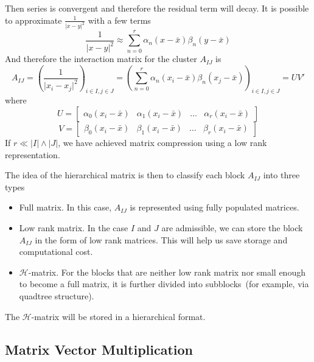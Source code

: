 \documentclass[3p,,preprint,12pt]{elsarticle}
\theoremstyle{definition}
\begin{document}
Then series is convergent and therefore the residual term will decay. It is possible to approximate $\frac{1}{{|x - y{|^2}}}$ with a few terms
\begin{equation}
	\frac{1}{{|x - y{|^2}}} \approx \sum_{n=0}^r \alpha_n(x-\bar x)\beta_n(y-\bar x)
\end{equation}
And therefore the interaction matrix for the cluster $A_{IJ}$ is 
\begin{equation}
	A_{IJ} = \left(\frac{1}{{|x_i - x_j{|^2}}}\right)_{i\in I, j\in J} =\left( \sum_{n=0}^r \alpha_n(x_i-\bar x)\beta_n(x_j-\bar x)\right)_{i\in I, j\in J} = UV'
\end{equation}
where
\begin{equation}
	U = \begin{bmatrix}
		\alpha_0(x_i-\bar x)& \alpha_1(x_i-\bar x)&\ldots & \alpha_r(x_i-\bar x)
	\end{bmatrix}
\end{equation}
\begin{equation}
	V = \begin{bmatrix}
		\beta_0(x_i-\bar x)& \beta_1(x_i-\bar x)&\ldots & \beta_r(x_i-\bar x)
	\end{bmatrix}
\end{equation}
If $r\ll |I|\wedge |J|$, we have achieved matrix compression using a low rank representation. 

The idea of the hierarchical matrix is then to classify each block $A_{IJ}$ into three types
\begin{itemize}
\item Full matrix. In this case, $A_{IJ}$ is represented using fully populated matrices.
\item Low rank matrix. In the case $I$ and $J$ are admissible, we can store the block $A_{IJ}$ in the form of low rank matrices. This will help us save storage and computational cost.
	\item $\mathcal{H}$-matrix. For the blocks that are neither low rank matrix nor small enough to become a full matrix, it is further divided into subblocks~(for example, via quadtree structure). 
\end{itemize}

The $\mathcal{H}$-matrix will be stored in a hierarchical format. 


\subsection{Matrix Vector Multiplication}
\end{document}
